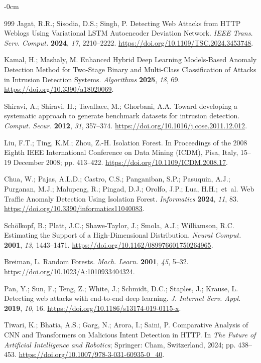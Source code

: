 \documentclass[futureinternet,article,accept,moreauthors]{Definitions/mdpi}
\begin{document}
\begin{adjustwidth}{-\extralength}{0cm}
\begin{thebibliography}{999}
Jagat, R.R.; Sisodia, D.S.; Singh, P. Detecting Web Attacks from HTTP Weblogs Using Variational LSTM Autoencoder Deviation Network. \emph{IEEE Trans. Serv. Comput.} \textbf{2024}, \emph{17}, 2210--2222. \url{https://doi.org/10.1109/TSC.2024.3453748}.

Kamal, H.; Mashaly, M. Enhanced Hybrid Deep Learning Models-Based Anomaly Detection Method for Two-Stage Binary and Multi-Class Classification of Attacks in Intrusion Detection Systems. \emph{Algorithms} \textbf{2025}, \emph{18}, 69. \url{https://doi.org/10.3390/a18020069}.

Shiravi, A.; Shiravi, H.; Tavallaee, M.; Ghorbani, A.A. Toward developing a systematic approach to generate benchmark datasets for intrusion detection. \emph{Comput. Secur.} \textbf{2012}, \emph{31}, 357--374. \url{https://doi.org/10.1016/j.cose.2011.12.012}.

Liu, F.T.; Ting, K.M.; Zhou, Z.-H. Isolation Forest. In Proceedings of the 2008 Eighth IEEE International Conference on Data Mining (ICDM), Pisa, Italy, 15--19 December 2008; pp. 413--422. \url{https://doi.org/10.1109/ICDM.2008.17}.

Chua, W.; Pajas, A.L.D.; Castro, C.S.; Panganiban, S.P.; Pasuquin, A.J.; Purganan, M.J.; Malupeng, R.; Pingad, D.J.; Orolfo, J.P.; Lua, H.H.;~et~al. Web Traffic Anomaly Detection Using Isolation Forest. \emph{Informatics} \textbf{2024}, \emph{11}, 83. \url{https://doi.org/10.3390/informatics11040083}.

Sch\"{o}lkopf, B.; Platt, J.C.; Shawe-Taylor, J.; Smola, A.J.; Williamson, R.C. Estimating the Support of a High-Dimensional Distribution. \emph{Neural Comput.} \textbf{2001}, \emph{13}, 1443--1471. \url{https://doi.org/10.1162/089976601750264965}.

Breiman, L. Random Forests. \emph{Mach. Learn.} \textbf{2001}, \emph{45}, 5--32. \url{https://doi.org/10.1023/A:1010933404324}.

Pan, Y.; Sun, F.; Teng, Z.; White, J.; Schmidt, D.C.; Staples, J.; Krause, L. Detecting web attacks with end-to-end deep learning. \emph{J. Internet Serv. Appl.} \textbf{2019}, \emph{10}, 16. \url{https://doi.org/10.1186/s13174-019-0115-x}.

Tiwari, K.; Bhatia, A.S.; Garg, N.; Arora, I.; Saini, P. Comparative Analysis of CNN and Transformers on Malicious Intent Detection in HTTP. In \emph{The Future of Artificial Intelligence and Robotics}; Springer: Cham, Switzerland, 2024; pp. 438--453. \url{https://doi.org/10.1007/978-3-031-60935-0_40}.


\end{thebibliography}
\end{adjustwidth}
\end{document}
